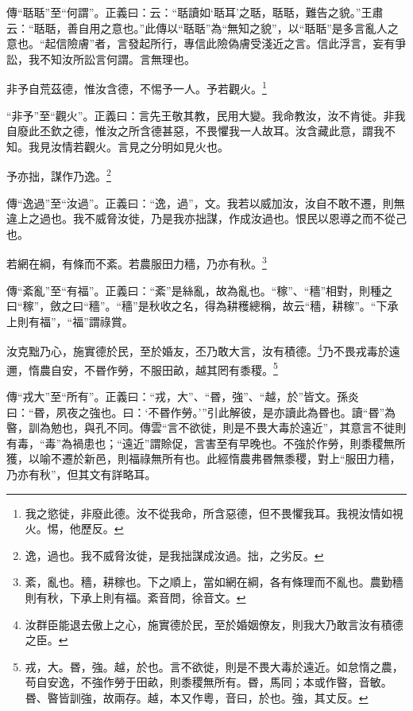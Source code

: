 {\noindent\zhuan{}\fzbyks 傳“聒聒”至“何謂”。正義曰：云：“聒讀如‘聒耳’之聒，聒聒，難告之貌。”王肅云：“聒聒，善自用之意也。”此傳以“聒聒”為“無知之貌”，以“聒聒”是多言亂人之意也。“起信險膚”者，言發起所行，專信此險偽膚受淺近之言。信此浮言，妄有爭訟，我不知汝所訟言何謂。言無理也。 \par}

非予自荒茲德，惟汝含德，不惕予一人。予若觀火。\footnote{我之慾徙，非廢此德。汝不從我命，所含惡德，但不畏懼我耳。我視汝情如視火。惕，他歷反。}

{\noindent\shu{}\fzkt “非予”至“觀火”。正義曰：言先王敬其教，民用大變。我命教汝，汝不肯徙。非我自廢此丕欽之德，惟汝之所含德甚惡，不畏懼我一人故耳。汝含藏此意，謂我不知。我見汝情若觀火。言見之分明如見火也。 \par}

予亦拙，謀作乃逸。\footnote{逸，過也。我不威脅汝徙，是我拙謀成汝過。拙，之劣反。}

{\noindent\zhuan{}\fzbyks 傳“逸過”至“汝過”。正義曰：“逸，過”，文。我若以威加汝，汝自不敢不遷，則無違上之過也。我不威脅汝徙，乃是我亦拙謀，作成汝過也。恨民以恩導之而不從己也。 \par}

若網在綱，有條而不紊。若農服田力穡，乃亦有秋。\footnote{紊，亂也。穡，耕稼也。下之順上，當如網在綱，各有條理而不亂也。農勤穡則有秋，下承上則有福。紊音問，徐音文。}

{\noindent\zhuan{}\fzbyks 傳“紊亂”至“有福”。正義曰：“紊”是絲亂，故為亂也。“稼”、“穡”相對，則種之曰“稼”，斂之曰“穡”。“穡”是秋收之名，得為耕穫總稱，故云“穡，耕稼”。“下承上則有福”，“福”謂祿賞。 \par}

汝克黜乃心，施實德於民，至於婚友，丕乃敢大言，汝有積德。\footnote{汝群臣能退去傲上之心，施實德於民，至於婚姻僚友，則我大乃敢言汝有積德之臣。}乃不畏戎毒於遠邇，惰農自安，不昬作勞，不服田畝，越其罔有黍稷。\footnote{戎，大。昬，強。越，於也。言不欲徙，則是不畏大毒於遠近。如怠惰之農，苟自安逸，不強作勞于田畝，則黍稷無所有。昬，馬同；本或作暋，音敏。昬、暋皆訓強，故兩存。越，本又作粵，音曰，於也。強，其丈反。}

{\noindent\zhuan{}\fzbyks 傳“戎大”至“所有”。正義曰：“戎，大”、“昬，強”、“越，於”皆文。孫炎曰：“昬，夙夜之強也。曰：‘不昬作勞。’”引此解彼，是亦讀此為昬也。讀“昬”為暋，訓為勉也，與孔不同。傳雲“言不欲徙，則是不畏大毒於遠近”，其意言不徙則有毒，“毒”為禍患也；“遠近”謂賒促，言害至有早晚也。不強於作勞，則黍稷無所獲，以喻不遷於新邑，則福祿無所有也。此經惰農弗昬無黍稷，對上“服田力穡，乃亦有秋”，但其文有詳略耳。 \par}

